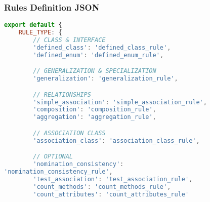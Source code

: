 \subsubsection{Rules Definition JSON}
\begin{lstlisting}[caption={Rules Definition JSON}, label={lst:rules_def}, language=javascript]
export default {
    RULE_TYPE: {
        // CLASS & INTERFACE
        'defined_class': 'defined_class_rule',
        'defined_enum': 'defined_enum_rule',

        // GENERALIZATION & SPECIALIZATION
        'generalization': 'generalization_rule',

        // RELATIONSHIPS
        'simple_association': 'simple_association_rule',
        'composition': 'composition_rule',
        'aggregation': 'aggregation_rule',

        // ASSOCIATION CLASS
        'association_class': 'association_class_rule',

        // OPTIONAL
        'nomination_consistency':
'nomination_consistency_rule',
        'test_association': 'test_association_rule',
        'count_methods': 'count_methods_rule',
        'count_attributes': 'count_attributes_rule'


\end{lstlisting}
